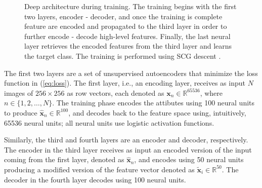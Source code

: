 \documentclass[a4paper]{article}
\begin{document}
\begin{figure}
\caption{Deep architecture during training. The training begins with the first
two layers, encoder - decoder, and once the training is complete feature are
encoded and propagated to the third layer in order to further
encode - decode high-level features. Finally, the last neural layer retrieves
the encoded features from the third layer and learns the target class. The
training is performed using SCG descent \cite{le2013building}.}
\label{fig:TrainingArchitecture}
\end{figure}
The first two layers are a set of unsupervised autoencoders that minimize the
loss function in (\ref{eq:loss}). The first layer, i.e., an encoding layer,
receives as input $N$ images of $256\times 256$ as row vectors, each denoted as 
$\mathbf{x}_n \in \mathbb{R}^{65536}$, where $n \in \{1,2, \dots, N\}$. The
training phase encodes the attibutes using 100 neural units to produce
$\mathbf{\hat{x}}_n \in \mathbb{R}^{100}$, and decodes back to
the feature space using, intuitively, 65536 neural units; all neural units use
logistic activation functions. 

Similarly, the third and fourth layers are an encoder and decoder,
respectively. The encoder in the third layer receives as input an encoded
version of the input coming from the first layer, denoted as
$\mathbf{\hat{x}}_n$, and encodes using 50 neural units producing a modified
version of the feature vector denoted as 
$\mathbf{\tilde{x}}_i \in \mathbb{R}^{50}$. 
The decoder in the fourth layer decodes using 100 neural units. 
\end{document}
